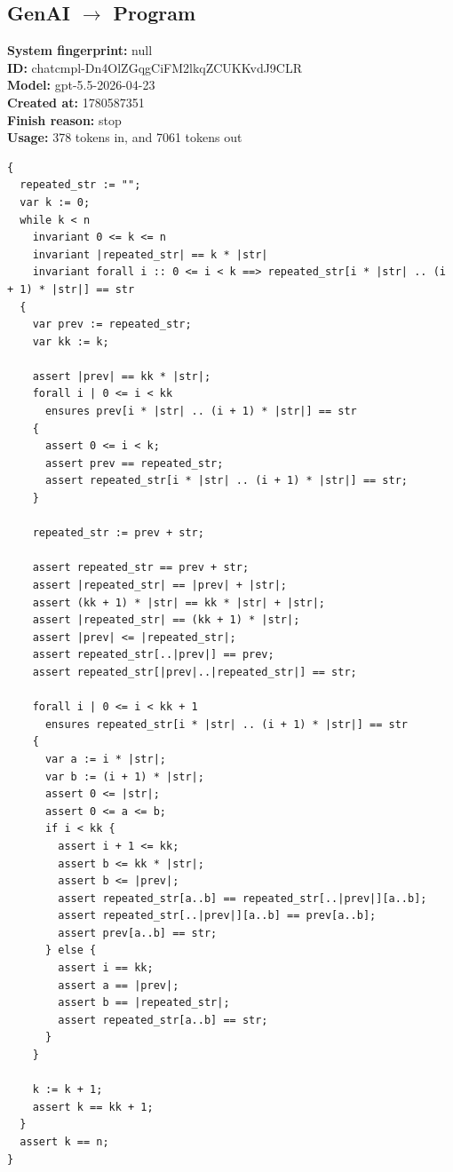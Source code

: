 \documentclass{article}
\begin{document}
\subsection*{GenAI $\rightarrow$ Program}
\textbf{System fingerprint: }null
\\\textbf{ID: }chatcmpl-Dn4OlZGqgCiFM2lkqZCUKKvdJ9CLR
\\\textbf{Model: }gpt-5.5-2026-04-23
\\\textbf{Created at: }1780587351
\\\textbf{Finish reason: }stop
\\\textbf{Usage: }378 tokens in, and 7061 tokens out
\begin{lstlisting}
{
  repeated_str := "";
  var k := 0;
  while k < n
    invariant 0 <= k <= n
    invariant |repeated_str| == k * |str|
    invariant forall i :: 0 <= i < k ==> repeated_str[i * |str| .. (i + 1) * |str|] == str
  {
    var prev := repeated_str;
    var kk := k;

    assert |prev| == kk * |str|;
    forall i | 0 <= i < kk
      ensures prev[i * |str| .. (i + 1) * |str|] == str
    {
      assert 0 <= i < k;
      assert prev == repeated_str;
      assert repeated_str[i * |str| .. (i + 1) * |str|] == str;
    }

    repeated_str := prev + str;

    assert repeated_str == prev + str;
    assert |repeated_str| == |prev| + |str|;
    assert (kk + 1) * |str| == kk * |str| + |str|;
    assert |repeated_str| == (kk + 1) * |str|;
    assert |prev| <= |repeated_str|;
    assert repeated_str[..|prev|] == prev;
    assert repeated_str[|prev|..|repeated_str|] == str;

    forall i | 0 <= i < kk + 1
      ensures repeated_str[i * |str| .. (i + 1) * |str|] == str
    {
      var a := i * |str|;
      var b := (i + 1) * |str|;
      assert 0 <= |str|;
      assert 0 <= a <= b;
      if i < kk {
        assert i + 1 <= kk;
        assert b <= kk * |str|;
        assert b <= |prev|;
        assert repeated_str[a..b] == repeated_str[..|prev|][a..b];
        assert repeated_str[..|prev|][a..b] == prev[a..b];
        assert prev[a..b] == str;
      } else {
        assert i == kk;
        assert a == |prev|;
        assert b == |repeated_str|;
        assert repeated_str[a..b] == str;
      }
    }

    k := k + 1;
    assert k == kk + 1;
  }
  assert k == n;
}
\end{lstlisting}
\end{document}
